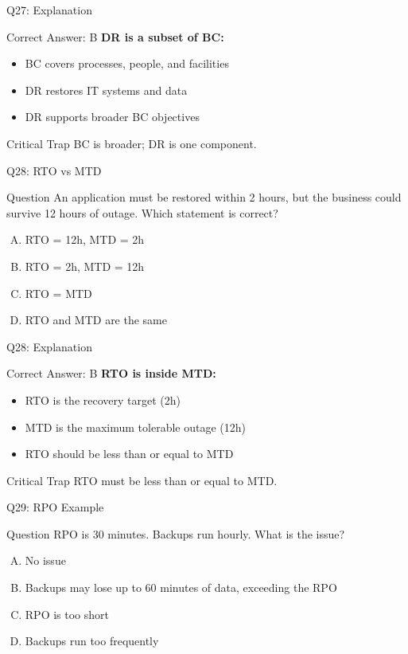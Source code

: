 \documentclass{beamer}
\begin{document}
	\begin{frame}{Q27: Explanation}
		\begin{block}{Correct Answer: B}
			\textbf{DR is a subset of BC:}
			\begin{itemize}
				\item BC covers processes, people, and facilities
				\item DR restores IT systems and data
				\item DR supports broader BC objectives
			\end{itemize}
		\end{block}
		\begin{alertblock}{Critical Trap}
			BC is broader; DR is one component.
		\end{alertblock}
	\end{frame}
	
	\begin{frame}{Q28: RTO vs MTD}
		\begin{block}{Question}
			An application must be restored within 2 hours, but the business could survive 12 hours of outage. Which statement is correct?
		\end{block}
		\begin{enumerate}[(A)]
			\item RTO = 12h, MTD = 2h
			\item RTO = 2h, MTD = 12h
			\item RTO = MTD
			\item RTO and MTD are the same
		\end{enumerate}
	\end{frame}
	
	\begin{frame}{Q28: Explanation}
		\begin{block}{Correct Answer: B}
			\textbf{RTO is inside MTD:}
			\begin{itemize}
				\item RTO is the recovery target (2h)
				\item MTD is the maximum tolerable outage (12h)
				\item RTO should be less than or equal to MTD
			\end{itemize}
		\end{block}
		\begin{alertblock}{Critical Trap}
			RTO must be less than or equal to MTD.
		\end{alertblock}
	\end{frame}
	
	\begin{frame}{Q29: RPO Example}
		\begin{block}{Question}
			RPO is 30 minutes. Backups run hourly. What is the issue?
		\end{block}
		\begin{enumerate}[(A)]
			\item No issue
			\item Backups may lose up to 60 minutes of data, exceeding the RPO
			\item RPO is too short
			\item Backups run too frequently
		\end{enumerate}
	\end{frame}
	
\end{document}
